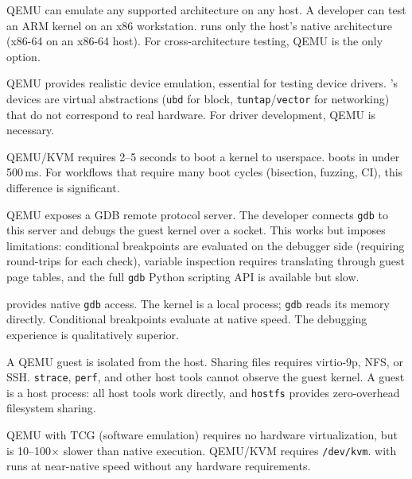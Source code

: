 \begin{description}[style=nextline,leftmargin=2em]
  \item[Architecture support.]
    QEMU can emulate any supported architecture on any host.  A
    developer can test an ARM kernel on an x86 workstation.  \UML{}
    runs only the host's native architecture (x86-64 on an x86-64
    host).  For cross-architecture testing, QEMU is the only option.

  \item[Device emulation.]
    QEMU provides realistic device emulation, essential for testing
    device drivers.  \UML{}'s devices are virtual abstractions
    (\texttt{ubd} for block, \texttt{tuntap}/\texttt{vector} for
    networking) that do not correspond to real hardware.  For driver
    development, QEMU is necessary.

  \item[Startup time.]
    QEMU/KVM requires 2--5 seconds to boot a kernel to userspace.
    \UML{} boots in under 500\,ms.  For workflows that require many
    boot cycles (bisection, fuzzing, CI), this difference is
    significant.

  \item[Debugging experience.]
    QEMU exposes a GDB remote protocol server.  The developer connects
    \texttt{gdb} to this server and debugs the guest kernel over a
    socket.  This works but imposes limitations: conditional breakpoints
    are evaluated on the debugger side (requiring round-trips for each
    check), variable inspection requires translating through guest page
    tables, and the full \texttt{gdb} Python scripting API is
    available but slow.

    \UML{} provides native \texttt{gdb} access.  The kernel is a
    local process; \texttt{gdb} reads its memory directly.  Conditional
    breakpoints evaluate at native speed.  The debugging experience
    is qualitatively superior.

  \item[Host tool access.]
    A QEMU guest is isolated from the host.  Sharing files requires
    virtio-9p, NFS, or SSH.  \texttt{strace}, \texttt{perf}, and
    other host tools cannot observe the guest kernel.  A \UML{} guest
    is a host process: all host tools work directly, and
    \texttt{hostfs} provides zero-overhead filesystem sharing.

  \item[Hardware requirements.]
    QEMU with TCG (software emulation) requires no hardware
    virtualization, but is 10--100$\times$ slower than native execution.
    QEMU/KVM requires \texttt{/dev/kvm}.  \UML{} with \Seccomp{}
    runs at near-native speed without any hardware requirements.
\end{description}

